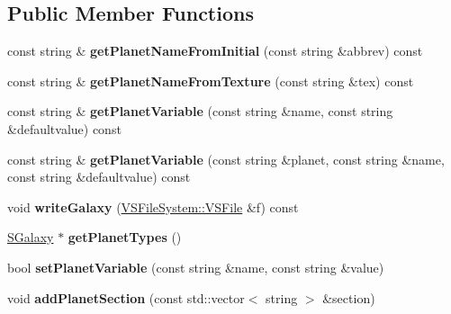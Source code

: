 \subsection*{Public Member Functions}
\begin{DoxyCompactItemize}
\item 
const string \& {\bfseries get\+Planet\+Name\+From\+Initial} (const string \&abbrev) const \hypertarget{classGalaxyXML_1_1Galaxy_a1864897bdebe0458d096239235afdf45}{}\label{classGalaxyXML_1_1Galaxy_a1864897bdebe0458d096239235afdf45}

\item 
const string \& {\bfseries get\+Planet\+Name\+From\+Texture} (const string \&tex) const \hypertarget{classGalaxyXML_1_1Galaxy_a8759e12f2386ffa9b2ef0874d98df1f4}{}\label{classGalaxyXML_1_1Galaxy_a8759e12f2386ffa9b2ef0874d98df1f4}

\item 
const string \& {\bfseries get\+Planet\+Variable} (const string \&name, const string \&defaultvalue) const \hypertarget{classGalaxyXML_1_1Galaxy_a3f89630c547071c66c0f8d94fd14c6c8}{}\label{classGalaxyXML_1_1Galaxy_a3f89630c547071c66c0f8d94fd14c6c8}

\item 
const string \& {\bfseries get\+Planet\+Variable} (const string \&planet, const string \&name, const string \&defaultvalue) const \hypertarget{classGalaxyXML_1_1Galaxy_a3276efa86384c0986639a0e43b901ec3}{}\label{classGalaxyXML_1_1Galaxy_a3276efa86384c0986639a0e43b901ec3}

\item 
void {\bfseries write\+Galaxy} (\hyperlink{classVSFileSystem_1_1VSFile}{V\+S\+File\+System\+::\+V\+S\+File} \&f) const \hypertarget{classGalaxyXML_1_1Galaxy_aaf3fc721994f760b37500233beeba054}{}\label{classGalaxyXML_1_1Galaxy_aaf3fc721994f760b37500233beeba054}

\item 
\hyperlink{classGalaxyXML_1_1SGalaxy}{S\+Galaxy} $\ast$ {\bfseries get\+Planet\+Types} ()\hypertarget{classGalaxyXML_1_1Galaxy_a42301d47b55f8752b753d64acc198f48}{}\label{classGalaxyXML_1_1Galaxy_a42301d47b55f8752b753d64acc198f48}

\item 
bool {\bfseries set\+Planet\+Variable} (const string \&name, const string \&value)\hypertarget{classGalaxyXML_1_1Galaxy_a6f99c9373af81984027838caeb99efc8}{}\label{classGalaxyXML_1_1Galaxy_a6f99c9373af81984027838caeb99efc8}

\item 
void {\bfseries add\+Planet\+Section} (const std\+::vector$<$ string $>$ \&section)\hypertarget{classGalaxyXML_1_1Galaxy_aa527db88d87842943734a0c5af9b4cce}{}\label{classGalaxyXML_1_1Galaxy_aa527db88d87842943734a0c5af9b4cce}


\end{DoxyCompactItemize}
